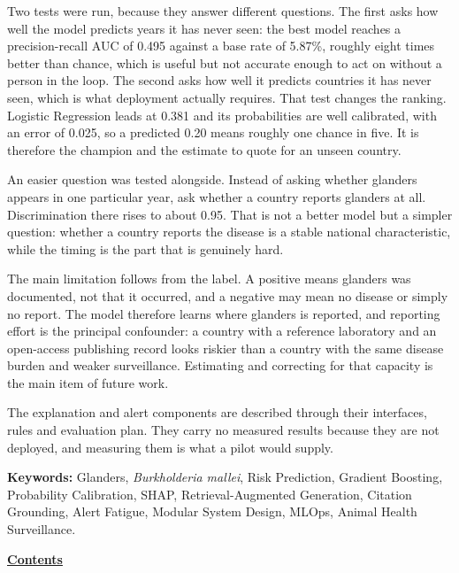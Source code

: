 \documentclass[10pt,openany]{report}
\begin{document}
\vspace{0.5em}
\noindent
Two tests were run, because they answer different questions. The first asks how well the model predicts
years it has never seen: the best model reaches a precision-recall AUC of 0.495 against a base
rate of 5.87\%, roughly eight times better than chance, which is useful but not accurate enough
to act on without a person in the loop. The second asks how well it predicts countries it has never
seen, which is what deployment actually requires. That test changes the ranking. Logistic Regression leads at
0.381 and its probabilities are well calibrated, with an error of 0.025, so a predicted 0.20
means roughly one chance in five. It is therefore the champion and the estimate to quote for an
unseen country.

\vspace{0.4em}
\noindent
An easier question was tested alongside. Instead of asking whether glanders appears in one particular
year, ask whether a country reports glanders at all. Discrimination there rises to about 0.95. That is
not a better model but a simpler question: whether a country reports the disease is a stable national
characteristic, while the timing is the part that is genuinely hard.

\vspace{0.4em}
\noindent
The main limitation follows from the label. A positive means glanders was documented, not that it
occurred, and a negative may mean no disease or simply no report. The model therefore learns where
glanders is reported, and reporting effort is the principal confounder: a country with a reference
laboratory and an open-access publishing record looks riskier than a country with the same disease
burden and weaker surveillance. Estimating and correcting for that capacity is the main item of future
work.

\vspace{0.4em}
\noindent
The explanation and alert components are described through their interfaces, rules and evaluation
plan. They carry no measured results because they are not deployed, and measuring them is what a pilot
would supply.

\vspace{0.7em}
\noindent
\textbf{Keywords:} Glanders, \textit{Burkholderia mallei}, Risk Prediction, Gradient Boosting,
Probability Calibration, SHAP, Retrieval-Augmented Generation, Citation Grounding, Alert Fatigue,
Modular System Design, MLOps, Animal Health Surveillance.

\newpage
\pagestyle{plain}
\noindent\underline{\textbf{Contents}}
\vspace{0.55cm}
\end{document}
